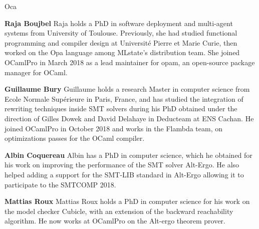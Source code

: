 \begin{sitedescription}{Oca}
\begin{compactitem} %
  \item{\bf Raja Boujbel} Raja holds a PhD in software deployment and
    multi-agent systems from University of Toulouse. Previously, she had studied
    functional programming and compiler design at Université Pierre et Marie
    Curie, then worked on the Opa language among MLstate’s distribution team.
    She joined OCamlPro in March 2018 as a lead maintainer for opam, an
    open-source package manager for OCaml.
\item{\bf Guillaume Bury} Guillaume holds a research Master in computer
    science from Ecole Normale Supérieure in Paris, France, and has studied the
    integration of rewriting techniques inside SMT solvers during his PhD
    obtained under the direction of Gilles Dowek and David Delahaye in
    Deducteam at ENS Cachan. He joined OCamlPro in October 2018 and works in
    the Flambda team, on optimizations passes for the OCaml compiler.
\item{\bf Albin Coquereau} Albin has a PhD in computer science,
    which he obtained for his work on improving the performance of the SMT
    solver Alt-Ergo. He also helped adding a support for the SMT-LIB standard
    in Alt-Ergo allowing it to participate to the SMTCOMP 2018.
\item{\bf Mattias Roux} Mattias Roux holds a PhD in computer science
    for his work on the model checker Cubicle, with an extension of the backward
    reachability algorithm. He now works at OCamlPro on the Alt-ergo theorem
    prover.
\end{compactitem}

\end{sitedescription}

